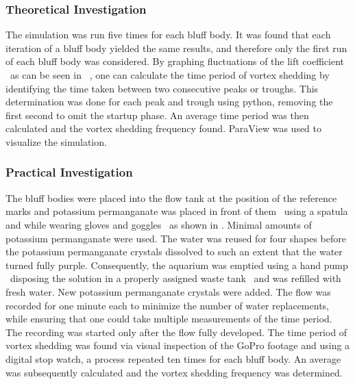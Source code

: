 \subsubsection{Theoretical Investigation}
\label{sec:theoreticalMethod}
The simulation was run five times for each bluff body. It was found that each iteration of a bluff body yielded the same results, and therefore only the first run of each bluff body was considered. By graphing fluctuations of the lift coefficient \textemdash\ as can be seen in  \textemdash\ , one can calculate the time period of vortex shedding by identifying the time taken between two consecutive peaks or troughs. This determination was done for each peak and trough using python, removing the first second to omit the startup phase. An average time period was then calculated and the vortex shedding frequency found. ParaView was used to visualize the simulation.

\subsubsection{Practical Investigation}
The bluff bodies were placed into the flow tank at the position of the reference marks and potassium permanganate was placed in front of them \textemdash\ using a spatula and while wearing gloves and goggles \textemdash\ as shown in . Minimal amounts of potassium permanganate were used. The water was reused for four shapes before the potassium permanganate crystals dissolved to such an extent that the water turned fully purple. Consequently, the aquarium was emptied using a hand pump \textemdash\ disposing the solution in a properly assigned waste tank \textemdash\ and was refilled with fresh water. New potassium permanganate crystals were added. The flow was recorded for one minute each to minimize the number of water replacements, while ensuring that one could take multiple measurements of the time period. The recording was started only after the flow fully developed. The time period of vortex shedding was found via visual inspection of the GoPro footage and using a digital stop watch, a process repeated ten times for each bluff body. An average was subsequently calculated and the vortex shedding frequency was determined.

